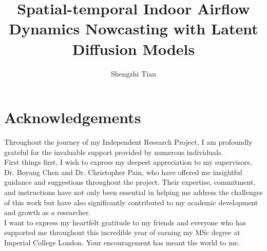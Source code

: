 \documentclass[final-report]{article-template}
\title{Spatial-temporal Indoor Airflow Dynamics Nowcasting with Latent Diffusion Models}
\author{Shengzhi Tian}
\begin{document}
\maketitlepage
\section*{Acknowledgements}

Throughout the journey of my Independent Research Project, I am profoundly grateful for the invaluable support provided by numerous individuals.\\

First things first, I wish to express my deepest appreciation to my supervisors, Dr. Boyang Chen and Dr. Christopher Pain, who have offered me insightful guidance and suggestions throughout the project. Their expertise, commitment, and instructions have not only been essential in helping me address the challenges of this work but have also significantly contributed to my academic development and growth as a researcher. \\

I want to express my heartfelt gratitude to my friends and everyone who has supported me throughout this incredible year of earning my MSc degree at Imperial College London. Your encouragement has meant the world to me.
\newpage
\tableofcontents
	
\end{document}
